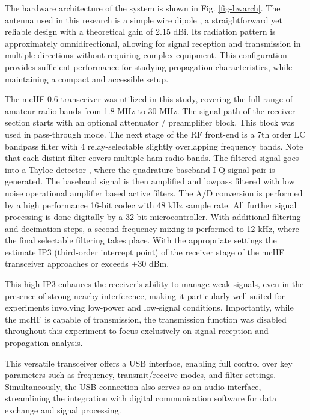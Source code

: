 \documentclass[signals,article,submit,pdftex,moreauthors]{Definitions/mdpi}
\begin{document}
The hardware architecture of the system is shown in Fig. \ref{fig-hwarch}.
The antenna used in this research is a simple wire dipole \cite{straw2003}, a straightforward
yet reliable design with a theoretical gain of 2.15 dBi. Its radiation pattern
is approximately omnidirectional, allowing for signal reception and
transmission in multiple directions without requiring complex equipment. This
configuration provides sufficient performance for studying propagation
characteristics, while maintaining a compact and accessible setup.

The mcHF 0.6 \cite{mchf} transceiver was utilized in this study, covering the full range of
amateur radio bands from 1.8 MHz to 30 MHz.
The signal path of the receiver section starts with an optional attenuator /
preamplifier block. This block was used in pass-through mode. The next stage
of the RF front-end is a 7th order LC bandpass filter with 4 relay-selectable
slightly overlapping frequency bands. Note that each distint filter covers
multiple ham radio bands. The filtered signal goes into a Tayloe detector
\cite{tayloe2003ultra}, where the quadrature baseband I-Q signal pair is generated.
The baseband signal is then amplified and lowpass filtered with low noise operational
amplifier based active filters. The A/D conversion is performed by a high performance 16-bit codec
with 48 kHz sample rate.
All further signal processing is done digitally by a 32-bit microcontroller.
With additional filtering and decimation steps, a second frequency mixing is
performed to 12 kHz, where the final selectable filtering takes place.
With the appropriate settings the estimate IP3 (third-order intercept point)
of the receiver stage of the mcHF transceiver approaches or exceeds +30 dBm.

This high IP3 enhances the
receiver’s ability to manage weak signals, even in the presence of strong
nearby interference, making it particularly well-suited for experiments
involving low-power and low-signal conditions. Importantly, while the mcHF is
capable of transmission, the transmission function was disabled throughout this
experiment to focus exclusively on signal reception and propagation analysis.

This versatile transceiver offers a
USB interface, enabling full control over key parameters such as frequency,
transmit/receive modes, and filter settings. Simultaneously, the USB connection
also serves as an audio interface, streamlining the integration with digital
communication software for data exchange and signal processing.
\end{document}
